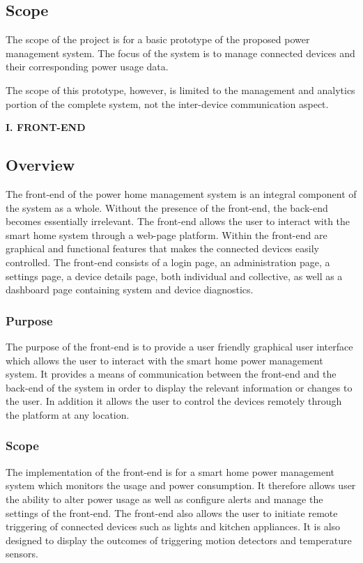 \documentclass[10pt,twocolumn]{witseiepaper}
\begin{document}
	\subsection{Scope}
	The scope of the project is for a basic prototype of the proposed power management system. The focus of the system is to manage connected devices and their corresponding power usage data. 
	
	The scope of this prototype, however, is limited to the management and analytics portion of the complete system, not the inter-device communication aspect. 
	
	\begin{center}
		\textbf{I. FRONT-END}
	\end{center}
	
	\subsection{Overview}
	The front-end of the power home management system is an integral component of the system as a whole. Without the presence of the front-end, the back-end becomes essentially irrelevant. The front-end allows the user to interact with the smart home system through a web-page platform. Within the front-end are graphical and functional features that makes the connected devices easily controlled. The front-end consists of a login page, an administration page, a settings page, a device details page, both individual and collective, as well as a dashboard page containing system and device diagnostics.
	
	\subsubsection{Purpose}
	The purpose of the front-end is to provide a user friendly graphical user interface which allows the user to interact with the smart home power management system. It provides a means of communication between the front-end and the back-end of the system in order to display the relevant information or changes to the user. In addition it allows the user to control the devices remotely through the platform at any location.
	
	\subsubsection{Scope}
	The implementation of the front-end is for a smart home power management system which monitors the usage and power consumption. It therefore allows user the ability to alter power usage as well as configure alerts and manage the settings of the front-end. The front-end also allows the user to initiate remote triggering of connected devices such as lights and kitchen appliances. It is also designed to display the outcomes of triggering motion detectors and temperature sensors.
	
\end{document}
